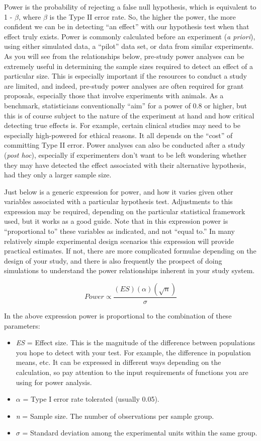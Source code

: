 \documentclass[]{book}
\begin{document}
Power is the probability of rejecting a false null hypothesis, which is equivalent to 1 - \(\beta\), where \(\beta\) is the Type II error rate. So, the higher the power, the more confident we can be in detecting ``an effect'' with our hypothesis test when that effect truly exists. Power is commonly calculated before an experiment (\emph{a priori}), using either simulated data, a ``pilot'' data set, or data from similar experiments. As you will see from the relationships below, pre-study power analyses can be extremely useful in determining the sample sizes required to detect an effect of a particular size. This is especially important if the resources to conduct a study are limited, and indeed, pre-study power analyses are often required for grant proposals, especially those that involve experiments with animals. As a benchmark, statisticians conventionally ``aim'' for a power of 0.8 or higher, but this is of course subject to the nature of the experiment at hand and how critical detecting true effects is. For example, certain clinical studies may need to be especially high-powered for ethical reasons. It all depends on the ``cost'' of committing Type II error. Power analyses can also be conducted after a study (\emph{post hoc}), especially if experimenters don't want to be left wondering whether they may have detected the effect associated with their alternative hypothesis, had they only a larger sample size.

Just below is a generic expression for power, and how it varies given other variables associated with a particular hypothesis test. Adjustments to this expression may be required, depending on the particular statistical framework used, but it works as a good guide. Note that in this expression power is ``proportional to'' these variables as indicated, and not ``equal to.'' In many relatively simple experimental design scenarios this expression will provide practical estimates. If not, there are more complicated formulae depending on the design of your study, and there is also frequently the prospect of doing simulations to understand the power relationships inherent in your study system.

\[ Power \propto \frac{(ES)(\alpha)(\sqrt n)}{\sigma}\]

In the above expression power is proportional to the combination of these parameters:

\begin{itemize}
\item
  \emph{ES} = Effect size. This is the magnitude of the difference between populations you hope to detect with your test. For example, the difference in population means, etc. It can be expressed in different ways depending on the calculation, so pay attention to the input requirements of functions you are using for power analysis.
\item
  \(\alpha\) = Type I error rate tolerated (usually 0.05).
\item
  \emph{n} = Sample size. The number of observations per sample group.
\item
  \(\sigma\) = Standard deviation among the experimental units within the same group.
\end{itemize}
\end{document}
